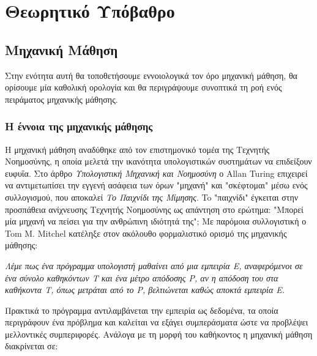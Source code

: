\chapter{Θεωρητικό Υπόβαθρο}	
\section{Μηχανική Μάθηση}
Στην ενότητα αυτή θα τοποθετήσουμε εννοιολογικά τον όρο μηχανική μάθηση, θα ορίσουμε μία καθολική ορολογία και θα περιγράψουμε συνοπτικά τη ροή ενός πειράματος μηχανικής μάθησης.

\subsection{Η έννοια της μηχανικής μάθησης}
Η μηχανική μάθηση αναδύθηκε από τον επιστημονικό τομέα της Τεχνητής Νοημοσύνης, η οποία μελετά την ικανότητα υπολογιστικών συστημάτων να επιδείξουν ευφυΐα. Στο άρθρο \textit{Υπολογιστική Μηχανική και Νοημοσύνη} \citep{Turing:1995:CMI:216408.216410} ο Allan Turing επιχειρεί να αντιμετωπίσει την εγγενή ασάφεια των όρων "μηχανή" και "σκέφτομαι" μέσω ενός συλλογισμού, που αποκαλεί \textit{Το Παιχνίδι της Μίμησης}. To "παιχνίδι" έγκειται στην προσπάθεια ανίχνευσης Τεχνητής Νοημοσύνης ως απάντηση στο ερώτημα: "Μπορεί μία μηχανή να πείσει για την ανθρώπινη ιδιότητά της"; Με παρόμοια συλλογιστική ο Tom M. Mitchel \citep{Mitchell:1997:ML:541177} κατέληξε στον ακόλουθο φορμαλιστικό ορισμό της μηχανικής μάθησης: 

\begin{displayquote}
	\textit{
	Λέμε πως ένα πρόγραμμα υπολογιστή μαθαίνει από μια εμπειρία \textit{Ε}, αναφερόμενοι σε ένα σύνολο καθηκόντων \textit{Τ} και ένα μέτρο απόδοσης \textit{P}, αν η απόδοση του στα καθήκοντα \textit{T}, όπως μετράται από το \textit{P}, βελτιώνεται καθώς αποκτά εμπειρία \textit{Ε}. }
\end{displayquote}

Πρακτικά το πρόγραμμα αντιλαμβάνεται την εμπειρία ως δεδομένα, τα οποία περιγράφουν ένα πρόβλημα και καλείται να εξάγει συμπεράσματα ώστε να προβλέψει μελλοντικές συμπεριφορές. Ανάλογα με τη μορφή του καθήκοντος η μηχανική μάθηση διακρίνεται σε:


